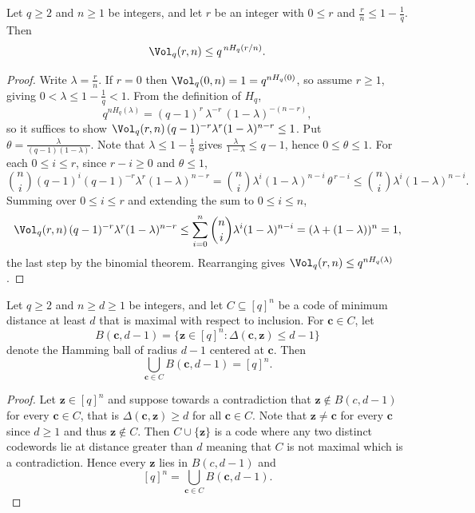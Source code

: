 \begin{lemma}
\label{lemma:VolEntropy}
\leanok
{}
Let $q \geq 2$ and $n \geq 1$ be integers, and let $r$ be an integer with $0 \leq r$ and $\frac{r}{n} \leq 1 - \frac{1}{q}$. Then
\[
  \Vol_q(r, n) \leq q^{\,n H_q(r/n)}.
\]
\end{lemma}
\begin{proof}
  Write $\lambda = \frac{r}{n}$. If $r = 0$ then $\Vol_q(0, n) = 1 = q^{n H_q(0)}$, so assume $r \geq 1$, giving $0 < \lambda \leq 1 - \frac{1}{q} < 1$. From the definition of $H_q$,
  \[
    q^{n H_q(\lambda)} = (q-1)^{r}\, \lambda^{-r}\,(1-\lambda)^{-(n-r)},
  \]
  so it suffices to show $\Vol_q(r,n)\,(q-1)^{-r}\lambda^{r}(1-\lambda)^{n-r} \leq 1$. Put $\theta = \frac{\lambda}{(q-1)(1-\lambda)}$. Note that $\lambda \leq 1 - \frac{1}{q}$ gives $\frac{\lambda}{1-\lambda} \leq q-1$, hence $0 \leq \theta \leq 1$. For each $0 \leq i \leq r$, since $r - i \geq 0$ and $\theta \leq 1$,
  \[
    \binom{n}{i} (q-1)^{i} (q-1)^{-r}\lambda^{r}(1-\lambda)^{n-r} = \binom{n}{i} \lambda^{i} (1-\lambda)^{n-i}\,\theta^{\,r-i} \leq \binom{n}{i} \lambda^{i} (1-\lambda)^{n-i}.
  \]
  Summing over $0 \leq i \leq r$ and extending the sum to $0 \leq i \leq n$,
  \[
    \Vol_q(r,n)\,(q-1)^{-r}\lambda^{r}(1-\lambda)^{n-r} \leq \sum_{i=0}^{n}\binom{n}{i} \lambda^{i}(1-\lambda)^{n-i} = (\lambda + (1-\lambda))^{n} = 1,
  \]
  the last step by the binomial theorem. Rearranging gives $\Vol_q(r,n) \leq q^{n H_q(\lambda)}$.
\end{proof}


\begin{lemma}[Covering]
\label{lemma:covers}
\leanok
{}
Let $q \geq 2$ and $n \geq d \geq 1$ be integers, and let $C \subseteq [q]^{n}$ be a
code of minimum distance at least $d$ that is maximal with respect to inclusion.
For $\mathbf{c} \in C$, let
\[
  B(\mathbf{c}, d-1) = \{ \mathbf{z} \in [q]^{n} : \Delta(\mathbf{c}, \mathbf{z}) \le d-1 \}
\]
denote the Hamming ball of radius $d-1$ centered at $\mathbf{c}$.
Then
\[
  \bigcup_{\mathbf{c} \in C} B(\mathbf{c}, d-1) = [q]^{n}.
\]
\end{lemma}

\begin{proof}
  Let $\mathbf{z} \in [q]^{n}$ and suppose towards a contradiction that $\mathbf{z} \notin B(c, d-1)$ for every $\mathbf{c} \in C$, that is $\Delta(\mathbf{c}, \mathbf{z}) \geq d$ for all $\mathbf{c} \in C$.
  Note that $\mathbf{z} \neq \mathbf{c}$ for every $\mathbf{c}$ since $d \geq 1$ and thus $\mathbf{z} \notin C$.
  Then $C \cup \{\mathbf{z}\}$ is a code where any two distinct codewords lie at distance greater than $d$ meaning that $C$ is not maximal which is a contradiction.
  Hence every $\mathbf{z}$ lies in $B(c,d-1)$ and
  \[[q]^{n} = \bigcup_{\mathbf{c} \in C} B(\mathbf{c},d-1).\]
\end{proof}

